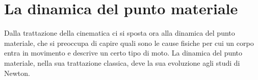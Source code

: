 \documentclass[10pt,a4paper]{book}
\begin{document}
\chapter{La dinamica del punto materiale}

Dalla trattazione della cinematica ci si sposta ora alla dinamica del punto materiale, che si preoccupa di capire quali sono le cause fisiche per cui un corpo entra in movimento e descrive un certo tipo di moto. La dinamica del punto materiale, nella sua trattazione classica, deve la sua evoluzione agli studi di Newton.
\end{document}

